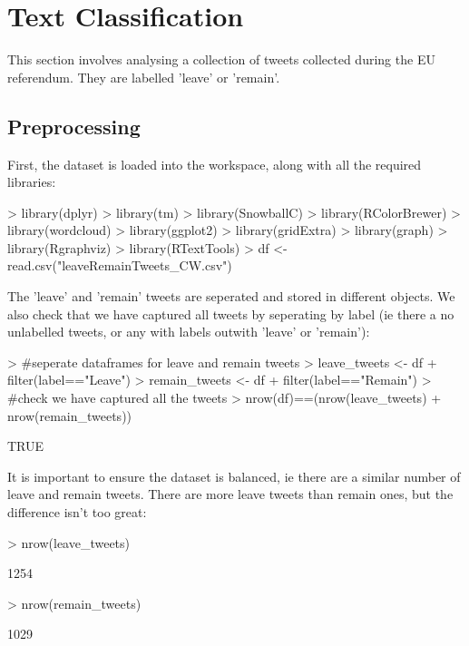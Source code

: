\documentclass[10pt]{article}
\begin{document}
\pagebreak


\section {Text Classification}

This section involves analysing a collection of tweets collected during the EU referendum. They are labelled 'leave' or 'remain'.



\subsection{Preprocessing}

First, the dataset is loaded into the workspace, along with all the required libraries:
\hspace{1cm} 
\begin{Schunk}
\begin{Sinput}
> library(dplyr)
> library(tm)
> library(SnowballC)
> library(RColorBrewer)
> library(wordcloud)
> library(ggplot2)
> library(gridExtra)
> library(graph)
> library(Rgraphviz)
> library(RTextTools)
> df <- read.csv("leaveRemainTweets_CW.csv")
\end{Sinput}
\end{Schunk}
\hspace{1cm} 
The 'leave' and 'remain' tweets are seperated and stored in different objects. We also check that we have captured all tweets by seperating by label (ie there a no unlabelled tweets, or any with labels outwith 'leave' or 'remain'):
\hspace{1cm} 
\begin{Schunk}
\begin{Sinput}
> #seperate dataframes for leave and remain tweets
> leave_tweets <- df%
+   filter(label=="Leave")
> remain_tweets <- df%
+   filter(label=="Remain")
> #check we have captured all the tweets
> nrow(df)==(nrow(leave_tweets) + nrow(remain_tweets))
\end{Sinput}
\begin{Soutput}
[1] TRUE
\end{Soutput}
\end{Schunk}
\hspace{1cm} 
It is important to ensure the dataset is balanced, ie there are a similar number of leave and remain tweets. There are more leave tweets than remain ones, but the difference isn't too great:
\hspace{1cm} 
\begin{Schunk}
\begin{Sinput}
> nrow(leave_tweets)
\end{Sinput}
\begin{Soutput}
[1] 1254
\end{Soutput}
\begin{Sinput}
> nrow(remain_tweets)
\end{Sinput}
\begin{Soutput}
[1] 1029
\end{Soutput}
\end{Schunk}
\end{document}
